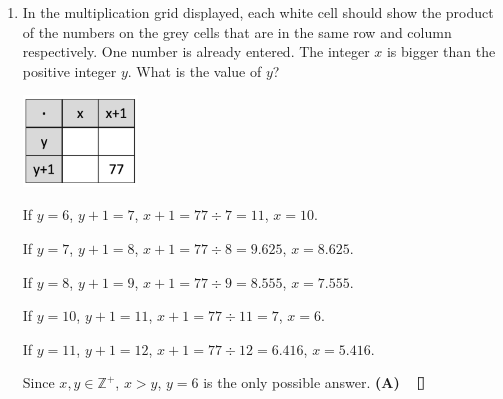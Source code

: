 \documentclass{report}
\begin{document}
\begin{multicols}{2}
\begin{enumerate}
              \sol{}

              From the picture, from top to bottom, the time spent on the apps are 4, 2, 2, 1
              respectively. In the options:
              \begin{enumerate}[label=(\Alph*)]
                  \item 2 (half), 1(half), 1(half), 0.5 (half)
                  \item 4, 2, 1 (half), 1
                  \item 2 (half), 2, 1 (half), 1
                  \item 3 (three quarter), 1 (half), 1 (half), 0.5 (half)
                  \item 2 (half), 1 (half), 1 (half), 1
              \end{enumerate}
              Hence, the correct answer is \textbf{(C)}. $\eos$

        \item In the multiplication grid displayed, each white cell should show the product
              of the numbers on the grey cells that are in the same row and column
              respectively. One number is already entered. The integer $x$ is bigger than the
              positive integer $y$. What is the value of $y$?

              \sol{}

              \begin{center}
                  \includegraphics[width=0.24\textwidth]{pictures/7.png}
              \end{center}

              If $y = 6$, $y + 1 = 7$, $x + 1 = 77 \div 7 = 11$, $x = 10$.

              If $y = 7$, $y + 1 = 8$, $x + 1 = 77 \div 8 = 9.625$, $x = 8.625$.

              If $y = 8$, $y + 1 = 9$, $x + 1 = 77 \div 9 = 8.555$, $x = 7.555$.

              If $y = 10$, $y + 1 = 11$, $x + 1 = 77 \div 11 = 7$, $x = 6$.

              If $y = 11$, $y + 1 = 12$, $x + 1 = 77 \div 12 = 6.416$, $x = 5.416$.

              Since $x, y \in \mathbb{Z^+}$, $x > y$, $y = 6$ is the only possible answer.
              \textbf{(A)} $\eos$


\end{enumerate}
\end{multicols}
\end{document}
